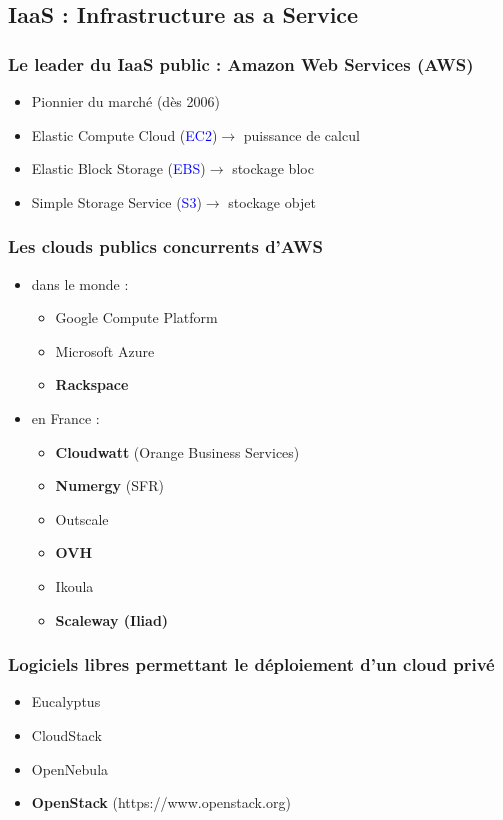   \subsection[IaaS]{IaaS : Infrastructure as a Service}

  \begin{frame}
    \frametitle{Le leader du IaaS public : Amazon Web Services (AWS)}
    \begin{itemize}
      \item Pionnier du marché (dès 2006)
      \pause
      \item Elastic Compute Cloud (\textcolor{blue}{EC2})\pause $\rightarrow$ puissance de calcul
      \pause
      \item Elastic Block Storage (\textcolor{blue}{EBS})\pause $\rightarrow$ stockage bloc
      \pause
      \item Simple Storage Service (\textcolor{blue}{S3})\pause $\rightarrow$ stockage objet
    \end{itemize}
  \end{frame}

  \begin{frame}
    \frametitle{Les clouds publics concurrents d'AWS}
    \begin{itemize}
      \item dans le monde :
      \begin{itemize}
        \item Google Compute Platform
        \item Microsoft Azure
        \item \textbf<3->{Rackspace}
      \end{itemize}
      \item en France :
      \begin{itemize}
        \item \textbf<3->{Cloudwatt} (Orange Business Services)
        \item \textbf<3->{Numergy} (SFR)
        \item Outscale
        \item \textbf<3->{OVH}
        \item Ikoula
        \item \textbf<3->{Scaleway (Iliad)}
      \end{itemize}
    \end{itemize}
  \end{frame}

  \begin{frame}
    \frametitle{Logiciels libres permettant le déploiement d'un cloud privé}
    \begin{itemize}
        \item Eucalyptus\pause
        \item CloudStack\pause
        \item OpenNebula\pause
        \item \textbf{OpenStack} (https://www.openstack.org)
    \end{itemize}
  \end{frame}

